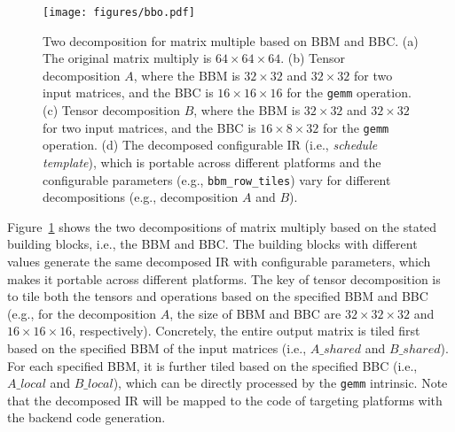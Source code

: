 \begin{figure}
  \begin{center}
\texttt{[image: figures/bbo.pdf]}
\end{center}
\vspace{-15pt}
\caption{\footnotesize Two decomposition for matrix multiple based on BBM and BBC. (a) The original matrix multiply is $64 \times 64 \times 64$. (b) Tensor decomposition $A$, where the BBM is $32 \times 32$ and $32 \times 32$ for two input matrices, and the BBC is $16 \times 16 \times 16$ for the \texttt{gemm} operation. (c) Tensor decomposition $B$, where the BBM is $32 \times 32$ and $32 \times 32$ for two input matrices, and the BBC is $16 \times 8 \times 32$ for the \texttt{gemm} operation. (d) The decomposed configurable IR (i.e., \emph{schedule template}), which is portable across different platforms and the configurable parameters (e.g., \texttt{bbm\_row\_tiles}) vary for different decompositions (e.g., decomposition $A$ and $B$).}
\label{fig:bbo}
\vspace{-5pt}
\end{figure}

Figure~\ref{fig:bbo} shows the two decompositions of matrix multiply based on the stated building blocks, i.e., the BBM and BBC. The building blocks with different values generate the same decomposed IR with configurable parameters, which makes it portable across different platforms. The key of tensor decomposition is to tile both the tensors and operations based on the specified BBM and BBC (e.g., for the decomposition $A$, the size of BBM and BBC are $32 \times 32 \times 32$ and $16 \times 16 \times 16$, respectively). Concretely, the entire output matrix is tiled first based on the specified BBM of the input matrices (i.e., $A\_shared$ and $B\_shared$). For each specified BBM, it is further tiled based on the specified BBC (i.e., $A\_local$ and $B\_local$), which can be directly processed by the \texttt{gemm} intrinsic. Note that the decomposed IR will be mapped to the code of targeting platforms with the backend code generation.


